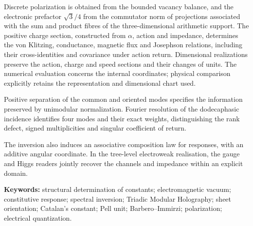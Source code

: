 Discrete polarization is obtained from the bounded vacancy balance,
and the electronic prefactor $\sqrt3/4$ from the commutator norm of
projections associated with the sum and product fibres of the
three-dimensional arithmetic support. The positive
charge section, constructed from $\alpha$, action and impedance,
determines the von Klitzing, conductance, magnetic flux and Josephson
relations, including their cross-identities and covariance under action
return. Dimensional realizations preserve the action, charge and speed
sections and their changes of units. The numerical evaluation
concerns the internal coordinates; physical comparison explicitly
retains the representation and dimensional chart used.

Positive separation of the common and oriented modes specifies the
information preserved by unimodular normalization. Fourier resolution
of the dodecaphasic incidence identifies four modes and their exact
weights, distinguishing the rank defect, signed multiplicities and
singular coefficient of return.

The inversion also induces an associative composition law for responses,
with an additive angular coordinate. In the tree-level electroweak
realisation, the gauge and Higgs readers jointly recover the channels
and impedance within an explicit domain.

\medskip
\noindent\textbf{Keywords:} structural determination of constants;
electromagnetic vacuum; constitutive response; spectral inversion;
Triadic Modular Holography; sheet orientation; Catalan's constant;
Pell unit; Barbero--Immirzi; polarization; electrical quantization.
\par\endgroup
